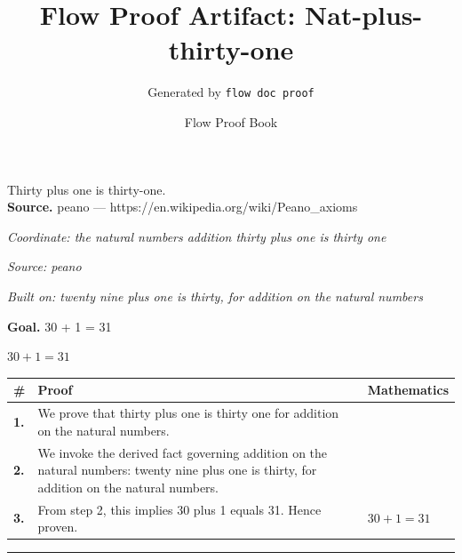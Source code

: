 \documentclass[11pt]{article}
\title{Flow Proof Artifact: Nat-plus-thirty-one}
\author{Generated by \texttt{flow doc proof}}
\date{Flow Proof Book}
\theoremstyle{definition}
\begin{document}
\maketitle
Thirty plus one is thirty-one.\\[0.5em]
\textbf{Source.} peano — https://en.wikipedia.org/wiki/Peano\_axioms\\[0.5em]
\bigskip
{}\par
\smallskip\noindent\textit{Coordinate: the natural numbers \cdot addition \cdot thirty plus one is thirty one}\par
\smallskip\noindent\textit{Source: peano}\par
\smallskip\noindent\textit{Built on: twenty nine plus one is thirty, for addition on the natural numbers}\par
\medskip
\noindent\textbf{Goal.} 30 + 1 = 31\par
\noindent$\displaystyle 30 + 1 = 31$\par
\medskip
\noindent
\begin{tabular}{@{} >{\raggedright\arraybackslash}p{} >{\raggedright\arraybackslash}p{} >{\raggedleft\arraybackslash}p{} @{}}
\textbf{\#} & \textbf{Proof} & \textbf{Mathematics} \\
\midrule
\textbf{1.} & We prove that thirty plus one is thirty one for addition on the natural numbers. & \\[0.45em]
\textbf{2.} & We invoke the derived fact governing addition on the natural numbers: twenty nine plus one is thirty, for addition on the natural numbers. & \\[0.45em]
\textbf{3.} & From step 2, this implies 30 plus 1 equals 31. Hence proven. & $\displaystyle 30 + 1 = 31$ \\[0.45em]
\bottomrule
\end{tabular}
\label{thm:Nat-addition-thirty_plus_one_is_thirty_one}
\par\medskip\hrule
\end{document}
